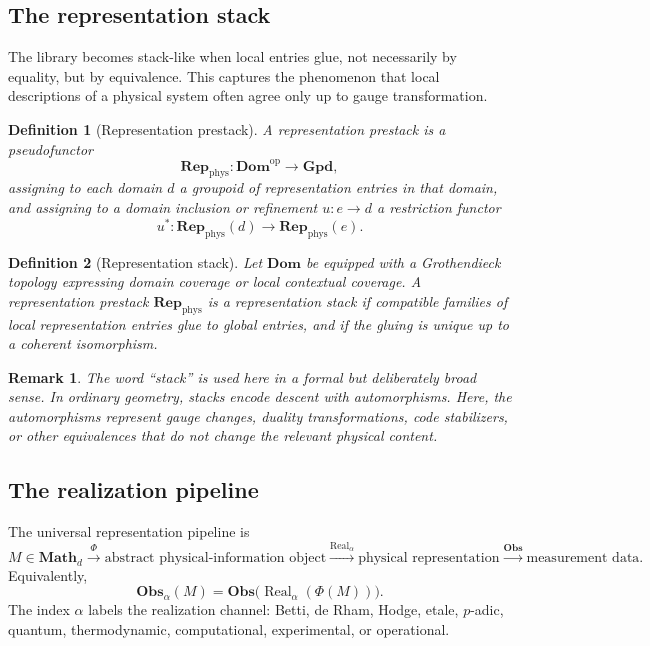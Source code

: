 \documentclass[11pt]{article}
\newtheorem{definition}{Definition}[section]
\newtheorem{remark}{Remark}[section]
\newcommand{\Math}{\mathbf{Math}}
\newcommand{\Dom}{\mathbf{Dom}}
\newcommand{\Rep}{\mathbf{Rep}}
\newcommand{\Obs}{\mathbf{Obs}}
\newcommand{\Real}{\operatorname{Real}}
\newcommand{\op}{\mathrm{op}}
\begin{document}
\subsection{The representation stack}

The library becomes stack-like when local entries glue, not necessarily by equality, but by equivalence. This captures the phenomenon that local descriptions of a physical system often agree only up to gauge transformation.

\begin{definition}[Representation prestack]
A \emph{representation prestack} is a pseudofunctor
\[
\Rep_{\mathrm{phys}}:\Dom^{\op}\longrightarrow \mathbf{Gpd},
\]
assigning to each domain $d$ a groupoid of representation entries in that domain, and assigning to a domain inclusion or refinement $u:e\to d$ a restriction functor
\[
u^\ast:\Rep_{\mathrm{phys}}(d)\to \Rep_{\mathrm{phys}}(e).
\]
\end{definition}

\begin{definition}[Representation stack]
Let $\Dom$ be equipped with a Grothendieck topology expressing domain coverage or local contextual coverage. A representation prestack $\Rep_{\mathrm{phys}}$ is a \emph{representation stack} if compatible families of local representation entries glue to global entries, and if the gluing is unique up to a coherent isomorphism.
\end{definition}

\begin{remark}
The word ``stack'' is used here in a formal but deliberately broad sense. In ordinary geometry, stacks encode descent with automorphisms. Here, the automorphisms represent gauge changes, duality transformations, code stabilizers, or other equivalences that do not change the relevant physical content.
\end{remark}

\subsection{The realization pipeline}

The universal representation pipeline is
\[
M\in\Math_d
\xrightarrow{\Phi}
\text{abstract physical-information object}
\xrightarrow{\Real_\alpha}
\text{physical representation}
\xrightarrow{\Obs}
\text{measurement data}.
\]
Equivalently,
\[
\boxed{\Obs_\alpha(M)=\Obs\bigl(\Real_\alpha(\Phi(M))\bigr).}
\]
The index $\alpha$ labels the realization channel: Betti, de Rham, Hodge, etale, $p$-adic, quantum, thermodynamic, computational, experimental, or operational.
\end{document}
